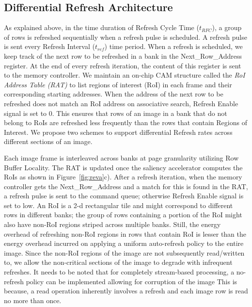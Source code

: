 \subsection{Differential Refresh Architecture}
As explained above, in the time duration of Refresh Cycle Time ($t_{RFC}$), a group of rows is refreshed sequentially when a refresh pulse is scheduled. A refresh pulse is sent every Refresh Interval ($t_{ref}$) time period.  When a refresh is scheduled, we keep track of the next row to be refreshed in a bank in the Next\_Row\_Address register. At the end of every refresh iteration, the content of this register is sent to the memory controller. We maintain an on-chip CAM structure called the \emph{RoI Address Table (RAT)} to list regions of interest (RoI) in each frame and their corresponding starting addresses. When the address of the next row to be refreshed does not match an RoI address on associative search, Refresh Enable signal is set to 0. This ensures that rows of an image in a bank that do not belong to RoIs are refreshed less frequently than the rows that contain Regions of Interest. We propose two schemes to support differential Refresh rates across different sections of an image. 

Each image frame is interleaved across banks at page granularity utilizing Row Buffer Locality. The RAT is updated once the saliency accelerator computes the RoIs as shown in Figure~\ref{fig:reva}c). After a refresh iteration, when the memory controller gets the Next\_Row\_Address and a match for this is found in the RAT, a refresh pulse is sent to the command queue; otherwise Refresh Enable signal is set to low. An RoI is a 2-d rectangular tile and might correspond to different rows in different banks; the group of rows containing a portion of the RoI might also have non-RoI regions striped across multiple banks. Still, the energy overhead of refreshing non-RoI regions in rows that contain RoI is lesser than the energy overhead incurred on applying a uniform auto-refresh policy to the entire image. Since the non-RoI regions of the image are not subsequently read/written to, we allow the non-critical sections of the image to degrade with infrequent refreshes.  
It needs to be noted that for completely stream-based processing, a no-refresh policy can be implemented allowing for corruption of the image
This is because, a read operation inherently involves a refresh and each image row is read no more than once.
 
